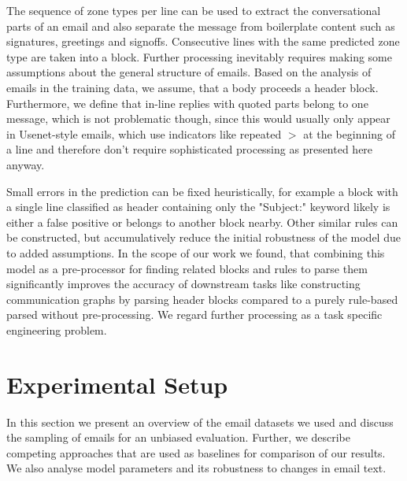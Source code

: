 \documentclass{llncs}
\begin{document}
The sequence of zone types per line can be used to extract the conversational parts of an email and also separate the message from boilerplate content such as signatures, greetings and signoffs.
Consecutive lines with the same predicted zone type are taken into a block.
Further processing inevitably requires making some assumptions about the general structure of emails.
Based on the analysis of emails in the training data, we assume, that a body proceeds a header block.
Furthermore, we define that in-line replies with quoted parts belong to one message, which is not problematic though, since this would usually only appear in Usenet-style emails, which use indicators like repeated $>$ at the beginning of a line and therefore don't require sophisticated processing as presented here anyway.

Small errors in the prediction can be fixed heuristically, for example a block with a single line classified as header containing only the "Subject:" keyword likely is either a false positive or belongs to another block nearby.
Other similar rules can be constructed, but accumulatively reduce the initial robustness of the model due to added assumptions.
In the scope of our work we found, that combining this model as a pre-processor for finding related blocks and rules to parse them significantly improves the accuracy of downstream tasks like constructing communication graphs by parsing header blocks compared to a purely rule-based parsed without pre-processing.
We regard further processing as a task specific engineering problem.



\section{Experimental Setup}
In this section we present an overview of the email datasets we used and discuss the sampling of emails for an unbiased evaluation.
Further, we describe competing approaches that are used as baselines for comparison of our results.
We also analyse model parameters and its robustness to changes in email text.
\end{document}
